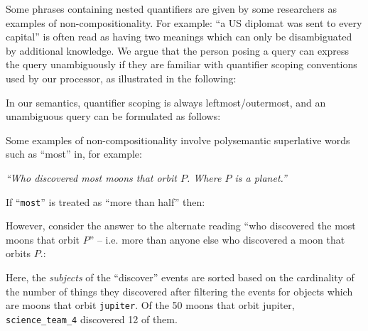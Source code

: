 \documentclass[../main.tex]{subfiles}
\begin{document}
\begin{refsection}
Some phrases containing nested quantifiers are given by some researchers as examples of non-compositionality. For example: ``a US diplomat was sent to every capital'' is often read as having two meanings which can only be disambiguated by additional knowledge. We argue that the person posing a query can express the query unambiguously if they are familiar with quantifier scoping conventions used by our processor, as illustrated in the following:

\examplespacing


\examplespacing

\noindent In our semantics, quantifier scoping is always leftmost/outermost, and an unambiguous query can be formulated as follows:

\examplespacing


\examplespacing

\noindent Some examples of non-compositionality involve polysemantic superlative words such as ``most'' in, for example:
\begin{center}
	\vspace{-0.25em}
	\textit{``Who discovered most moons that orbit $P$. Where $P$ is a planet.''}
	\vspace{-0.25em}
\end{center}
If ``\texttt{most}'' is treated as ``more than half'' then:

\examplespacing


\examplespacing

\noindent However, consider the answer to the alternate reading ``who discovered the most moons that orbit $P$'' – i.e. more than anyone else who discovered a moon that orbits $P$.:

\examplespacing


\examplespacing

\noindent Here, the \textit{subjects} of the ``discover'' events are sorted based on the cardinality of the number of things they discovered after filtering the events for objects which are moons that orbit \texttt{jupiter}.  Of the 50 moons that orbit jupiter, \linebreak \texttt{science\_team\_4} discovered 12 of them.


\end{refsection}
\end{document}
